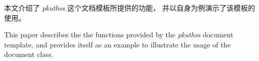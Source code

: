
\cleardoublepage
\begin{cabstract}

	本文介绍了 \emph{pkuthss} 这个文档模板所提供的功能，
	并以自身为例演示了该模板的使用。

\end{cabstract}

\cleardoublepage
\begin{eabstract}

	This paper describes the the functions provided by
	the \emph{pkuthss} document template,
	and provides itself as an example to illustrate
	the usage of the document class.

\end{eabstract}

